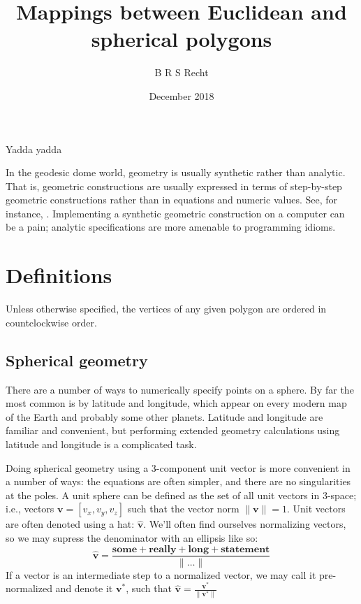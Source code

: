\documentclass{amsart}[12pt]
\title{Mappings between Euclidean and spherical polygons}
\author{B R S Recht}
\date{December 2018}
\begin{document}
\maketitle

Yadda yadda\cite{kahn}

In the geodesic dome world, geometry is usually synthetic rather than
analytic. That is, geometric constructions are usually expressed in terms of
step-by-step geometric constructions rather than in equations and numeric
values. See, for instance, \cite{kenner}. Implementing a synthetic geometric
construction on a computer can be a pain; analytic specifications are more
amenable to programming idioms.

\section{Definitions}
Unless otherwise specified, the vertices of any given polygon are ordered in
countclockwise order.

\subsection{Spherical geometry}
There are a number of ways to numerically specify points on a sphere. By far
the most common is by latitude and longitude, which appear on every modern map
of the Earth and probably some other planets. Latitude and longitude are
familiar and convenient, but performing extended geometry calculations using
latitude and longitude is a complicated task.

Doing spherical geometry using a 3-component unit vector is more convenient
in a number of ways: the equations are often simpler, and there are no
singularities at the poles. A unit sphere can be defined as the set of all unit
vectors in 3-space; i.e., vectors $\mathbf v = [v_x, v_y, v_z]$ such that the
vector norm $\|\mathbf v \|=1$. Unit vectors are often denoted using a hat:
$\hat{\mathbf v}$. We'll often find ourselves normalizing vectors,
so we may supress the denominator with an ellipsis like so:
\begin{equation}
  \hat{\mathbf v} = \frac{\mathbf{some+really+long+statement}}{\|\dots\|}
\end{equation}
If a vector is an intermediate step to a normalized vector,
we may call it pre-normalized and denote it ${\mathbf v}^*$,
such that $\hat{\mathbf v} = \frac{{\mathbf v}^*}{ \|{\mathbf v}^*\|}$
\end{document}
